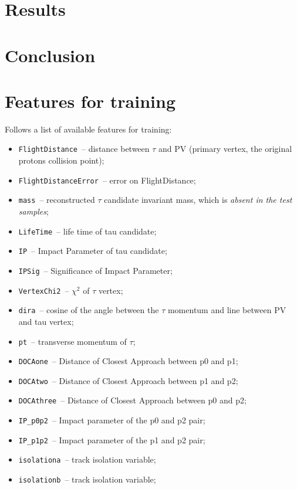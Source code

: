 \documentclass[conference]{IEEEtran}
\begin{document}
\section{Results}
\label{sec:results}

\section{Conclusion}
\label{sec:conclusion}

\clearpage
\appendix

\section{Features for training}
\label{sec:features}
Follows a list of available features for training:
\begin{itemize}
	\item \texttt{FlightDistance}~-- distance between $\tau$ and PV (primary vertex, the
	original protons collision point);
	\item \texttt{FlightDistanceError}~-- error on FlightDistance;
	\item \texttt{mass}~-- reconstructed $\tau$ candidate invariant mass, which
	is \textit{absent in the test samples};
	\item \texttt{LifeTime}~-- life time of tau candidate;
	\item \texttt{IP}~-- Impact Parameter of tau candidate;
	\item \texttt{IPSig}~-- Significance of Impact Parameter;
	\item \texttt{VertexChi2}~-- $\chi^2$ of $\tau$ vertex;
	\item \texttt{dira}~-- cosine of the angle between the $\tau$ momentum and line
	between PV and tau vertex;
	\item \texttt{pt}~-- transverse momentum of $\tau$;
	\item \texttt{DOCAone}~-- Distance of Closest Approach between p0 and p1;
	\item \texttt{DOCAtwo}~-- Distance of Closest Approach between p1 and p2;
	\item \texttt{DOCAthree}~-- Distance of Closest Approach between p0 and p2;
	\item \texttt{IP\_p0p2}~-- Impact parameter of the p0 and p2 pair;
	\item \texttt{IP\_p1p2}~-- Impact parameter of the p1 and p2 pair;
	\item \texttt{isolationa}~-- track isolation variable;
	\item \texttt{isolationb}~-- track isolation variable;

\end{itemize}
\end{document}
